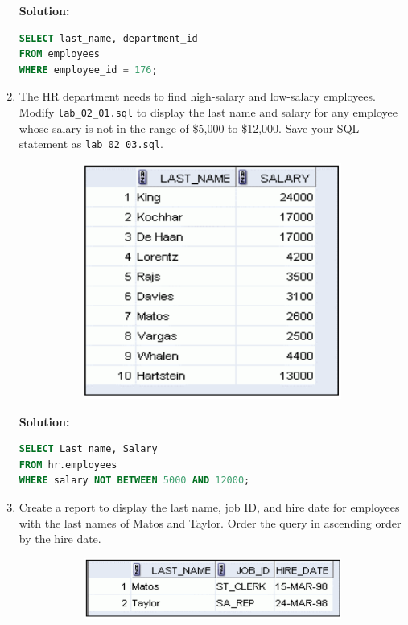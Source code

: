 \documentclass[a4paper,12pt]{article}
\begin{document}
\begin{enumerate}
    \textbf{Solution: }
    \begin{lstlisting}[language=SQL, label={lst:employees_data}]
SELECT last_name, department_id
FROM employees
WHERE employee_id = 176;
    \end{lstlisting}
    \item The HR department needs to find high-salary and low-salary employees. Modify
\texttt{lab\_02\_01.sql} to display the last name and salary for any employee whose salary is not in
the range of \$5,000 to \$12,000. Save your SQL statement as \texttt{lab\_02\_03.sql}.
\begin{figure}[h]
        \centering
        \begin{subfigure}[b]{0.35\linewidth}
            \centering
            \includegraphics[width=\linewidth]{graphics/23.png}
        \end{subfigure}
    \end{figure}        
    \newpage
    \textbf{Solution: }
    \begin{lstlisting}[language=SQL, label={lst:employees_data}]
SELECT Last_name, Salary
FROM hr.employees
WHERE salary NOT BETWEEN 5000 AND 12000;
    \end{lstlisting}
    \item Create a report to display the last name, job ID, and hire date for employees with the last names
of Matos and Taylor. Order the query in ascending order by the hire date.
\begin{figure}[h]
        \centering
        \begin{subfigure}[b]{0.35\linewidth}
            \centering
            \includegraphics[width=\linewidth]{graphics/24.png}
        \end{subfigure}
    \end{figure}        
    

\end{enumerate}
\end{document}
